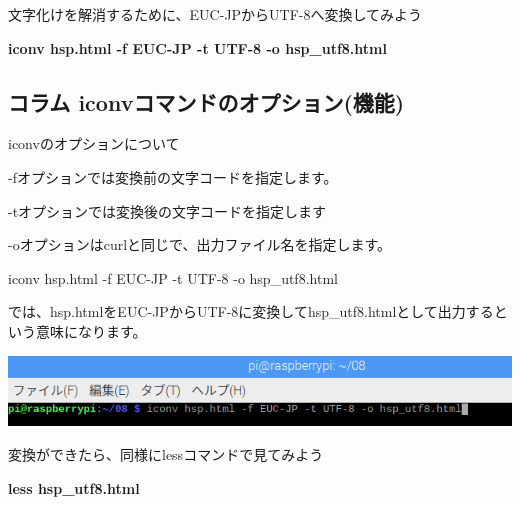 \documentclass[a4paper,12pt,dvipdfmx]{jarticle}
\begin{document}
\bigskip


\bigskip

\clearpage
文字化けを解消するために、EUC-JPからUTF-8へ変換してみよう

\textbf{iconv hsp.html -f EUC-JP -t UTF-8 -o hsp\_utf8.html}

\begin{center}
\begin{boxedminipage}{17.228cm}
\section*{コラム
iconvコマンドのオプション(機能)}
iconvのオプションについて

{}-fオプションでは変換前の文字コードを指定します。

{}-tオプションでは変換後の文字コードを指定します

{}-oオプションはcurlと同じで、出力ファイル名を指定します。

iconv hsp.html -f EUC-JP -t UTF-8 -o hsp\_utf8.html

では、hsp.htmlをEUC-JPからUTF-8に変換してhsp\_utf8.htmlとして出力するという意味になります。
\end{boxedminipage}
\end{center}
\begin{center}
\includegraphics[width=17.006cm]{textbook-img022.png}

\end{center}
変換ができたら、同様にlessコマンドで見てみよう

\textbf{less hsp\_utf8.html}
\end{document}

